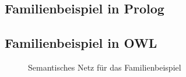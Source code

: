 \subsection{Familienbeispiel in Prolog}
\label{ssec:anh_beispiel_g_prolog}


\subsection{Familienbeispiel in OWL}
\label{ssec:anh_beispiel_g_owl}
%
\begin{figure}[H]
\centering {}
\caption{Semantisches Netz für das Familienbeispiel\label{fig:familiennetz}\protect\footnotemark}
\end{figure}




